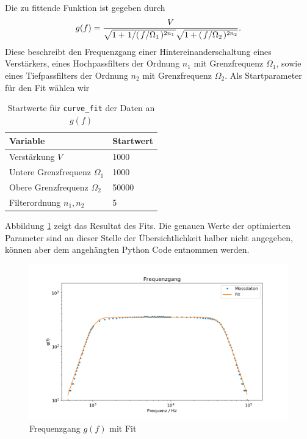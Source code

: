 Die zu fittende Funktion ist gegeben durch
\begin{align}
  g(f) = \frac{V}{\sqrt{1 + \flatfrac{1}{(\flatfrac{f}{\Omega_1})^{2 n_1}}} \sqrt{1 + (\flatfrac{f}{\Omega_2})^{2 n_2}}}.
\end{align}
Diese beschreibt den Frequenzgang einer Hintereinanderschaltung eines Verstärkers, eines Hochpassfilters der Ordnung $n_1$ mit Grenzfrequenz $\Omega_1$, sowie eines Tiefpassfilters der Ordnung $n_2$ mit Grenzfrequenz $\Omega_2$. Als Startparameter für den Fit wählen wir
\begin{table}[H]
  \centering
  \begin{tabular}{l|l}
    Variable & Startwert\\\hline
    Verstärkung $V$ & 1000\\
    Untere Grenzfrequenz $\Omega_1$ & 1000\\
    Obere Grenzfrequenz $\Omega_2$ & 50000\\
    Filterordnung $n_1, n_2$ & 5
  \end{tabular}
  \caption{Startwerte für \texttt{curve\_fit} der Daten an $g(f)$}
  \label{tab:startparams_fitfreq}
\end{table}

Abbildung \ref{plot:frequenzgang_fit} zeigt das Resultat des Fits. Die genauen Werte der optimierten Parameter sind an dieser Stelle der Übersichtlichkeit halber nicht angegeben, können aber dem angehängten Python Code entnommen werden.

\begin{figure}[H]
  \centering
  \includegraphics[width=.8\textwidth]{files/freq_data_fit.png}
  \caption{Frequenzgang $g(f)$ mit Fit}
  \label{plot:frequenzgang_fit}
\end{figure}


